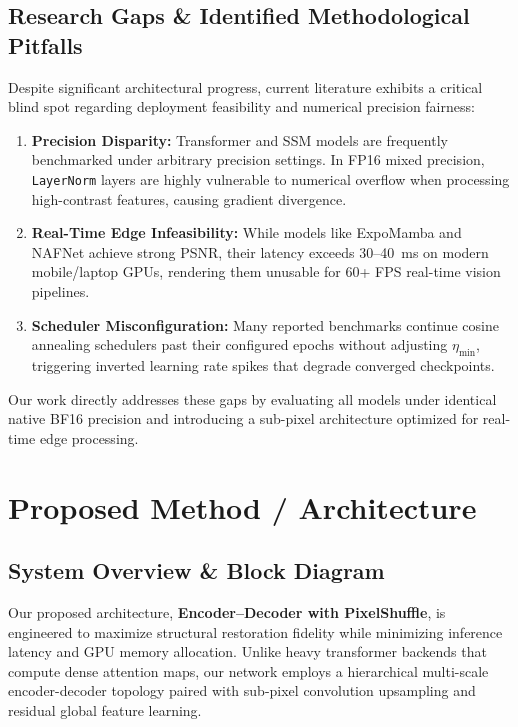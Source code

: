 \documentclass[journal,onecolumn,11pt]{IEEEtran}
\begin{document}
\subsection{Research Gaps \& Identified Methodological Pitfalls}
Despite significant architectural progress, current literature exhibits a critical blind spot regarding deployment feasibility and numerical precision fairness:
\begin{enumerate}
    \item \textbf{Precision Disparity:} Transformer and SSM models are frequently benchmarked under arbitrary precision settings. In FP16 mixed precision, \texttt{LayerNorm} layers are highly vulnerable to numerical overflow when processing high-contrast features, causing gradient divergence.
    \item \textbf{Real-Time Edge Infeasibility:} While models like ExpoMamba and NAFNet achieve strong PSNR, their latency exceeds 30--40~ms on modern mobile/laptop GPUs, rendering them unusable for 60+ FPS real-time vision pipelines.
    \item \textbf{Scheduler Misconfiguration:} Many reported benchmarks continue cosine annealing schedulers past their configured epochs without adjusting $\eta_{\min}$, triggering inverted learning rate spikes that degrade converged checkpoints.
\end{enumerate}
Our work directly addresses these gaps by evaluating all models under identical native BF16 precision and introducing a sub-pixel architecture optimized for real-time edge processing.

\section{Proposed Method / Architecture}

\subsection{System Overview \& Block Diagram}
Our proposed architecture, \textbf{Encoder--Decoder with PixelShuffle}, is engineered to maximize structural restoration fidelity while minimizing inference latency and GPU memory allocation. Unlike heavy transformer backends that compute dense attention maps, our network employs a hierarchical multi-scale encoder-decoder topology paired with sub-pixel convolution upsampling and residual global feature learning.
\end{document}
